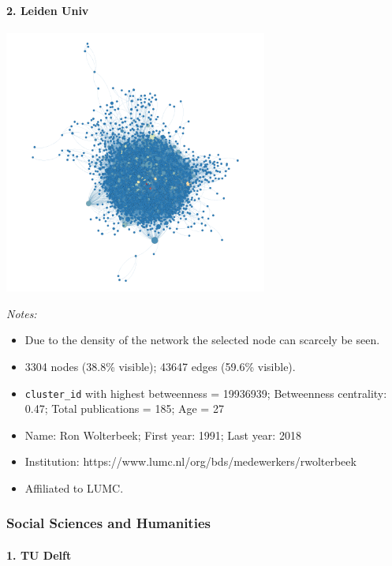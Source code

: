 \documentclass[]{elsarticle} %
\providecommand{\tightlist}{%
  \setlength{\itemsep}{0pt}\setlength{\parskip}{0pt}}
\begin{document}
\hypertarget{leiden-univ-1}{%
\paragraph{2. Leiden Univ}\label{leiden-univ-1}}

\includegraphics[width=3.41in]{figs/lu_bio_betweenness}

\emph{Notes:}

\begin{itemize}
\tightlist
\item
  Due to the density of the network the selected node can scarcely be
  seen.
\item
  3304 nodes (38.8\% visible); 43647 edges (59.6\% visible).
\item
  \texttt{cluster\_id} with highest betweenness = 19936939; Betweenness
  centrality: 0.47; Total publications = 185; Age = 27
\item
  Name: Ron Wolterbeek; First year: 1991; Last year: 2018
\item
  Institution: https://www.lumc.nl/org/bds/medewerkers/rwolterbeek
\item
  Affiliated to LUMC.
\end{itemize}

\hypertarget{social-sciences-and-humanities}{%
\subsubsection{Social Sciences and
Humanities}\label{social-sciences-and-humanities}}

\hypertarget{tu-delft-2}{%
\paragraph{1. TU Delft}\label{tu-delft-2}}
\end{document}
